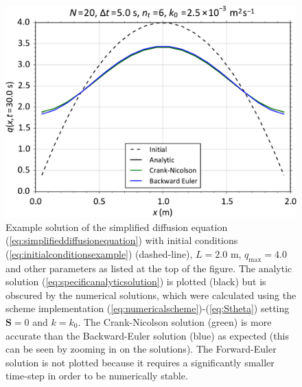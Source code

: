 \documentclass[12pt]{article}
\begin{document}
\begin{figure}[b]
\centering
\includegraphics[width=0.7\linewidth]{example_plot.pdf}
\caption{Example solution of the simplified diffusion equation (\ref{eq:simplifieddiffusionequation}) with initial conditions (\ref{eq:initialconditionsexample}) (dashed-line), $L=2.0$ m, $q_\mathrm{max}=4.0$ and other parameters as listed at the top of the figure. The analytic solution (\ref{eq:specificanalyticsolution}) is plotted (black) but is obscured by the numerical solutions, which were calculated using the scheme implementation (\ref{eq:numericalscheme})-(\ref{eq:Stheta}) setting $\mathbf{S}=0$ and $k=k_0$. The Crank-Nicolson solution (green) is more accurate than the Backward-Euler solution (blue) as expected (this can be seen by zooming in on the solutions). The Forward-Euler solution is not plotted because it requires a significantly smaller time-step in order to be numerically stable.}
\label{fig:example}
\end{figure} 
\end{document}

